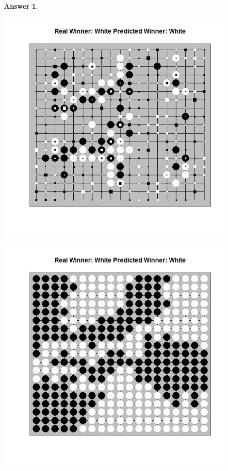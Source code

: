 \documentclass[12pt]{article}
\theoremstyle{colon}
\newtheorem*{answer}{Answer}
\begin{document}
\begin{answer}
\begin{enumerate}[label=\arabic*)]
      \begin{center}
        \includegraphics[width=0.9\textwidth]{game_4_prediction.jpg}
      \end{center}

      \begin{center}
        \includegraphics[width=0.9\textwidth]{game_4_final.jpg}
      \end{center}
  \end{enumerate}


\end{answer}
\end{document}
